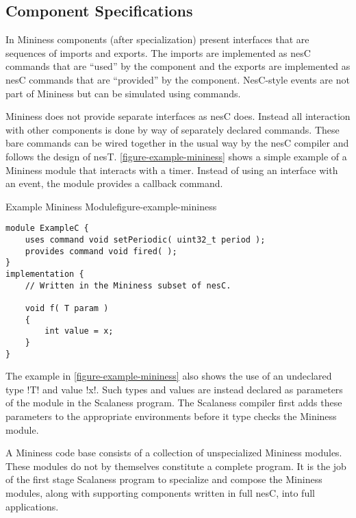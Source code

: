 \subsection{Component Specifications}
\label{section-component-specifications}

In Mininess components (after specialization) present interfaces that are sequences of imports
and exports. The imports are implemented as nesC commands that are ``used'' by the component and
the exports are implemented as nesC commands that are ``provided'' by the component. NesC-style
events are not part of Mininess but can be simulated using commands.


Mininess does not provide separate interfaces as nesC does. Instead all interaction with other
components is done by way of separately declared commands. These bare commands can be wired
together in the usual way by the nesC compiler \cite{Gay-nesC-2003} and follows the design of
nesT. \autoref{figure-example-mininess} shows a simple example of a Mininess module that
interacts with a timer. Instead of using an interface with an event, the module provides a
callback command.

\singlespace
\begin{fpfig}[tbhp]{Example Mininess Module}{figure-example-mininess}
{
\begin{lstlisting}[language=nesC]
module ExampleC {
    uses command void setPeriodic( uint32_t period );
    provides command void fired( );
}
implementation {
    // Written in the Mininess subset of nesC.

    void f( T param )
    {
        int value = x;
    }
}
\end{lstlisting}
}
\end{fpfig}
\primaryspacing

The example in \autoref{figure-example-mininess} also shows the use of an undeclared type !T!
and value !x!. Such types and values are instead declared as parameters of the module in the
Scalaness program. The Scalaness compiler first adds these parameters to the appropriate
environments before it type checks the Mininess module.

A Mininess code base consists of a collection of unspecialized Mininess modules. These modules
do not by themselves constitute a complete program. It is the job of the first stage Scalaness
program to specialize and compose the Mininess modules, along with supporting components written
in full nesC, into full applications.

